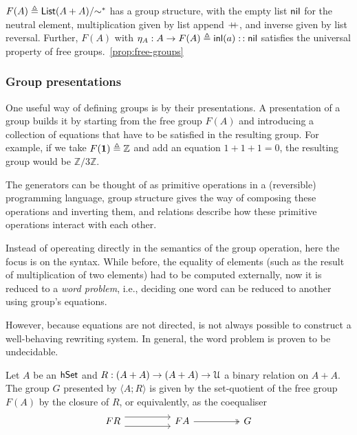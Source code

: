 \begin{proposition}
  $F(A) \defeq \quot{\List[A + A]}{\sim^{\ast}}$ has a group structure, with the
  empty list $\operatorname{\mathsf{nil}}$ for the neutral element, multiplication given by list append
  $\mathbin{+\kern -0.4em+}$, and inverse given by list reversal. Further, $F(A)$ with $\eta_A :
  A \to F(A) \mathrel{\triangleq} \operatorname{\mathsf{inl}}(a) \mathrel{\operatorname{\mathsf{::}}} \operatorname{\mathsf{nil}}$ satisfies the universal property of free
  groups.~\cref{prop:free-groups}
\end{proposition}

\subsubsection{Group presentations}

One useful way of defining groups is by their presentations. A presentation of a
group builds it by starting from the free group $F(A)$ and introducing a
collection of equations that have to be satisfied in the resulting group. For
example, if we take $F({\mathbf{1}}) \mathrel{\triangleq} \mathbb{Z}$ and add an equation $1 + 1 + 1
= 0$, the resulting group would be $\mathbb{Z}/3\mathbb{Z}$.

The generators can be thought of as primitive operations in a (reversible)
programming language, group structure gives the way of composing these
operations and inverting them, and relations describe how these primitive
operations interact with each other.

Instead of opereating directly in the semantics of the group operation, here the
focus is on the syntax. While before, the equality of elements (such as the
result of multiplication of two elements) had to be computed externally, now it is
reduced to a \emph{word problem}, i.e., deciding one word can be reduced to another
using group's equations.

However, because equations are not directed, is not always possible to construct a
well-behaving rewriting system. In general, the word problem is proven to be undecidable.


\begin{definition}
  Let $A$ be an $\mathsf{hSet}$ and $R : (A + A) \to (A + A) \to \UU$ a binary relation
  on $A + A$. The group $G$ presented by $\langle A ; R \rangle$ is given by the
  set-quotient of the free group $F(A)$ by the closure of $R$, or equivalently,
  as the coequaliser
  \[\begin{tikzcd}
      FR && FA && G
      \arrow[shift right=2, from=1-1, to=1-3]
      \arrow[shift left=2, from=1-1, to=1-3]
      \arrow[two heads, from=1-3, to=1-5]
    \end{tikzcd}\]
\end{definition}

